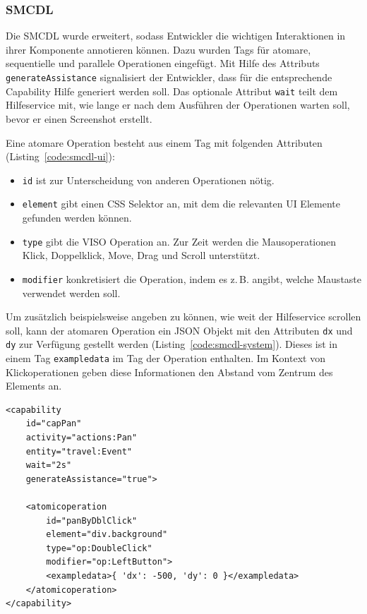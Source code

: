 \documentclass[
	headsepline,
	footsepline,
	fontsize=12pt,
	bibliography=totoc
]{scrbook}
\begin{document}
\subsubsection{SMCDL}

Die SMCDL wurde erweitert, sodass Entwickler die wichtigen Interaktionen in ihrer Komponente annotieren können. Dazu wurden Tags für atomare, sequentielle und parallele Operationen eingefügt. Mit Hilfe des Attributs \texttt{generateAssistance} signalisiert der Entwickler, dass für die entsprechende Capability Hilfe generiert werden soll. Das optionale Attribut \texttt{wait} teilt dem Hilfeservice mit, wie lange er nach dem Ausführen der Operationen warten soll, bevor er einen Screenshot erstellt.

Eine atomare Operation besteht aus einem Tag mit folgenden Attributen (Listing~\ref{code:smcdl-ui}):

\begin{itemize}
	\item \texttt{id} ist zur Unterscheidung von anderen Operationen nötig.
	\item \texttt{element} gibt einen CSS Selektor an, mit dem die relevanten UI Elemente gefunden werden können.
	\item \texttt{type} gibt die VISO Operation an. Zur Zeit werden die Mausoperationen Klick, Doppelklick, Move, Drag und Scroll unterstützt.
	\item \texttt{modifier} konkretisiert die Operation, indem es z.\,B. angibt, welche Maustaste verwendet werden soll.
\end{itemize}

Um zusätzlich beispielsweise angeben zu können, wie weit der Hilfeservice scrollen soll, kann der atomaren Operation ein JSON Objekt mit den Attributen \texttt{dx} und \texttt{dy} zur Verfügung gestellt werden (Listing~\ref{code:smcdl-system}). Dieses ist in einem Tag \texttt{exampledata} im Tag der Operation enthalten. Im Kontext von Klickoperationen geben diese Informationen den Abstand vom Zentrum des Elements an.

\lstset{language=XML}
\begin{lstlisting}[caption={SMCDL für UI Capability}, label=code:smcdl-ui]
<capability
	id="capPan"
	activity="actions:Pan"
	entity="travel:Event"
	wait="2s"
	generateAssistance="true">
	
	<atomicoperation
		id="panByDblClick"
		element="div.background"
		type="op:DoubleClick"
		modifier="op:LeftButton">
		<exampledata>{ 'dx': -500, 'dy': 0 }</exampledata>
	</atomicoperation>
</capability>
\end{lstlisting}
\end{document}
